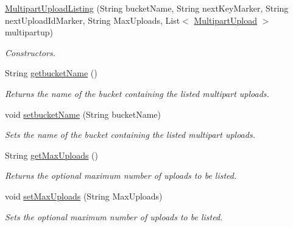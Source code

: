 \begin{DoxyCompactItemize}
\item 
\hyperlink{classorg_1_1jcs_1_1dss_1_1main_1_1MultipartUploadListing_a7dc6b93ee548163139b943378af45b60}{Multipart\+Upload\+Listing} (String bucket\+Name, String next\+Key\+Marker, String next\+Upload\+Id\+Marker, String Max\+Uploads, List$<$ \hyperlink{classorg_1_1jcs_1_1dss_1_1main_1_1MultipartUpload}{Multipart\+Upload} $>$ multipartup)\hypertarget{classorg_1_1jcs_1_1dss_1_1main_1_1MultipartUploadListing_a7dc6b93ee548163139b943378af45b60}{}\label{classorg_1_1jcs_1_1dss_1_1main_1_1MultipartUploadListing_a7dc6b93ee548163139b943378af45b60}

\begin{DoxyCompactList}\small\item\em Constructors. \end{DoxyCompactList}\item 
String \hyperlink{classorg_1_1jcs_1_1dss_1_1main_1_1MultipartUploadListing_af84fb44b692cda1c07547330901774fe}{getbucket\+Name} ()
\begin{DoxyCompactList}\small\item\em Returns the name of the bucket containing the listed multipart uploads. \end{DoxyCompactList}\item 
void \hyperlink{classorg_1_1jcs_1_1dss_1_1main_1_1MultipartUploadListing_afedef39aa6e27c16ad8a39c8703adac7}{setbucket\+Name} (String bucket\+Name)
\begin{DoxyCompactList}\small\item\em Sets the name of the bucket containing the listed multipart uploads. \end{DoxyCompactList}\item 
String \hyperlink{classorg_1_1jcs_1_1dss_1_1main_1_1MultipartUploadListing_a4ea8fbdf47534d3e2fdbf0d74023eed0}{get\+Max\+Uploads} ()
\begin{DoxyCompactList}\small\item\em Returns the optional maximum number of uploads to be listed. \end{DoxyCompactList}\item 
void \hyperlink{classorg_1_1jcs_1_1dss_1_1main_1_1MultipartUploadListing_ae65c24c0a9fdc36a143b16b6fafddc83}{set\+Max\+Uploads} (String Max\+Uploads)
\begin{DoxyCompactList}\small\item\em Sets the optional maximum number of uploads to be listed. \end{DoxyCompactList}\item 

\end{DoxyCompactItemize}
